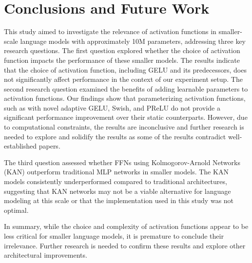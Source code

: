 \section{Conclusions and Future Work} %
\label{sec:conclusion}
This study aimed to investigate the relevance of activation functions in smaller-scale language models with approximately 10M parameters, addressing three key research questions. The first question explored whether the choice of activation function impacts the performance of these smaller models. The results indicate that the choice of activation function, including GELU and its predecessors, does not significantly affect performance in the context of our experiment setup. The second research question examined the benefits of adding learnable parameters to activation functions. Our findings show that parameterizing activation functions, such as with novel adaptive GELU, Swish, and PReLU do not provide a significant performance improvement over their static counterparts. However, due to computational constraints, the results are inconclusive and further research is needed to explore and solidify the results as some of the results contradict well-established papers.
 
The third question assessed whether FFNs using Kolmogorov-Arnold Networks (KAN) outperform traditional MLP networks in smaller models. The KAN models consistently underperformed compared to traditional architectures, suggesting that KAN networks may not be a viable alternative for language modeling at this scale or that the implementation used in this study was not optimal.

In summary, while the choice and complexity of activation functions appear to be less critical for smaller language models, it is premature to conclude their irrelevance. Further research is needed to confirm these results and explore other architectural improvements.